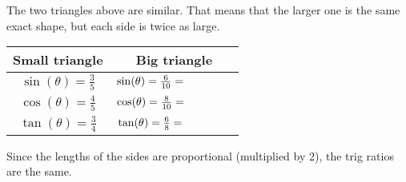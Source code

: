\documentclass[12pt]{article}
\begin{document}
\begin{center} 
\end{center}

The two triangles above are similar. That means that the larger one is the same exact shape, but each side is twice as large. 

\begin{center}
{\renewcommand{\arraystretch}{2}
\begin{tabular}{c | c} 

Small triangle & Big triangle\\ \hline

$\sin(\theta)=\frac{3}{5}$ & $\sin(\theta)=\frac{6}{10}= \hspace{1.5cm}$ \\

$\cos(\theta)=\frac{4}{5}$ & $\cos(\theta)=\frac{8}{10}=\hspace{1.5cm}$\\

$\tan(\theta)=\frac{3}{4}$ & $\tan(\theta)=\frac{6}{8}=\hspace{1.5cm}$

\end{tabular}} \quad
\end{center}

\vspace{.5cm}

Since the lengths of the sides are proportional (multiplied by 2), the trig ratios are the same. \\
\end{document}
